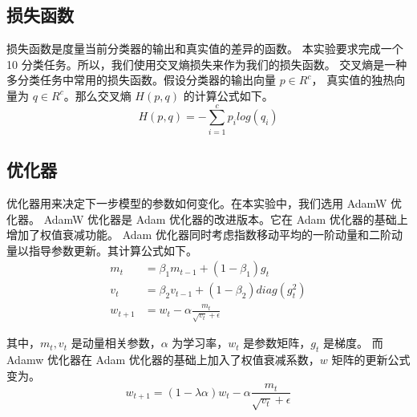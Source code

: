 \documentclass[supercite]{Experimental_Report}
\theoremstyle{definition}
\begin{document}
\subsection{损失函数}
损失函数是度量当前分类器的输出和真实值的差异的函数。
本实验要求完成一个 10 分类任务。所以，我们使用交叉熵损失来作为我们的损失函数。
交叉熵是一种多分类任务中常用的损失函数。假设分类器的输出向量 $p\in R^c$，
真实值的独热向量为 $q\in R^c$。那么交叉熵 $H(p, q)$ 的计算公式如下。
$$
H(p, q)=-\sum_{i=1}^{c}p_i log(q_i)
$$





\subsection{优化器}
优化器用来决定下一步模型的参数如何变化。在本实验中，我们选用 AdamW 优化器。
AdamW 优化器是 Adam 优化器的改进版本。它在 Adam 优化器的基础上增加了权值衰减功能。
Adam 优化器同时考虑指数移动平均的一阶动量和二阶动量以指导参数更新。其计算公式如下。
$$
\begin{aligned}
	m_t&=\beta_1m_{t-1}+(1-\beta_1)g_t\\
	v_t&=\beta_2v_{t-1}+(1-\beta_2)diag(g_t^2)\\
	w_{t+1}&=w_{t}-\alpha\frac{m_t}{\sqrt{v_t}+\epsilon}
\end{aligned}
$$

其中，$m_t, v_t$ 是动量相关参数，$\alpha$ 为学习率，$w_t$ 是参数矩阵，$g_t$ 是梯度。
而 Adamw 优化器在 Adam 优化器的基础上加入了权值衰减系数，$w$ 矩阵的更新公式变为。
$$
w_{t+1}=(1-\lambda \alpha)w_{t}-\alpha\frac{m_t}{\sqrt{v_t}+\epsilon}
$$
\end{document}
